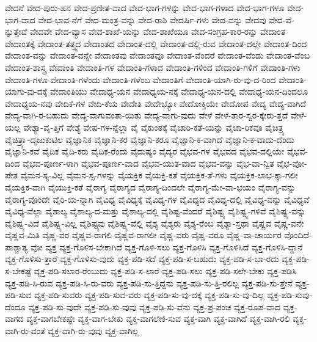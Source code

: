 {ವೇದನೆ
ವೇದ-ಪುರು-ಷನ
ವೇದ-ಪ್ರಣೀತ-ವಾದ
ವೇದ-ಭಾಗ-ಗಳನ್ನು
ವೇದ-ಭಾಗ-ಗಳಾದ
ವೇದ-ಭಾಗ-ಗಳೂ
ವೇದ-ಭಾಗ-ವಾದ
ವೇದ-ಭಾವ-ನೆಗೆ
ವೇದ-ಮಂತ್ರ-ವನ್ನು
ವೇದ-ರಾಶಿ
ವೇದರ್ಷಿ-ಗಳು
ವೇದ-ವನ್ನು
ವೇದವು
ವೇದ-ವೆ-ನ್ನುತ್ತೇವೆ
ವೇದವೇ
ವೇದ-ವ್ಯಾಸ
ವೇದ-ಶಾಖೆ-ಯನ್ನು
ವೇದ-ಶಾಖೆಯೂ
ವೇದ-ಸಂಗ್ರಹ-ಕಾರ-ರನ್ನು
ವೇದಾಂತ
ವೇದಾಂತಕ್ಕೆ
ವೇದಾಂತ-ತತ್ತ್ವದ
ವೇದಾಂತದ
ವೇದಾಂತ-ದಲ್ಲಿ
ವೇದಾಂತ-ದಲ್ಲಿ-ರುವ
ವೇದಾಂತ-ದಲ್ಲೇ
ವೇದಾಂತ-ದಿಂದ
ವೇದಾಂತ-ವನ್ನು
ವೇದಾಂತ-ವನ್ನೇ
ವೇದಾಂತವು
ವೇದಾಂತವೂ
ವೇದಾಂತ-ವೆಂದರೆ
ವೇದಾಂತ-ವೆಂದು
ವೇದಾಂತ-ವೆಂಬ
ವೇದಾಂತ-ಶಾಸ್ತ್ರ
ವೇದಾಂತಿ
ವೇದಾಂತಿ-ಗಳ
ವೇದಾಂತಿ-ಗಳಾದ
ವೇದಾಂತಿ-ಗಳಿಂದ
ವೇದಾಂತಿ-ಗಳಿಗೆ
ವೇದಾಂತಿ-ಗಳು
ವೇದಾಂತಿ-ಗಳೂ
ವೇದಾಂತಿ-ಗಳೆಂದು
ವೇದಾಂತಿ-ಗಳೆಂಬ
ವೇದಾಂತಿಗೆ
ವೇದಾಂತಿ-ಯಾಗಿ-ರು-ವು-ದ-ರಿಂದ
ವೇದಾಂತಿ-ಯಾಗು-ವು-ದಕ್ಕೆ
ವೇದಾಂತಿಯು
ವೇದಾಧ್ಯ-ಯನ
ವೇದಾಧ್ಯಯ-ನಕ್ಕೆ
ವೇದಾಧ್ಯ-ಯನ-ದಲ್ಲಿ
ವೇದಾಧ್ಯ-ಯನ-ದಿಂದಲೂ
ವೇದಾಧ್ಯಯ-ನವು
ವೇದಿಕೆ-ಗಳ
ವೇದಿ-ಕೆಯ
ವೇದೇತಿ
ವೇದೇಭ್ಯೋ
ವೇದೋಕ್ತಿಯೇ
ವೇದೋಪ
ವೇದ್ಯ
ವೇದ್ಯ-ವಾಗಿದೆ
ವೇದ್ಯ-ವಾಗಿ-ರ-ಬಹುದು
ವೇದ್ಯ-ವಾಗುವಂತಾ-ಯಿತು
ವೇದ್ಯ-ವಾಗು-ವುದು
ವೇಳೆ
ವೇಳೆ-ತಾರ-ಸ್ವರ-ಕ್ಕೇರು-ತ್ತದೆ
ವೇಳೆ-ಯಲ್ಲ
ವೇಶ್ಯಾ-ವೃ-ತ್ತಿಗೆ
ವೇಶ್ಯೆ
ವೇಷ-ಗಳ-ನ್ನೆಲ್ಲಾ
ವೈ
ವೈಕುಂಠಕ್ಕೆ
ವೈಚಾರಿ-ಕತೆ-ಯನ್ನು
ವೈಚಾ-ರಿಕವೂ
ವೈಚಿತ್ರ್ಯ
ವೈಚಿತ್ರ್ಯಾ-ದೃಜುಕುಟಿಲ
ವೈಜ್ಞಾನಿಕ
ವೈಜ್ಞಾನಿ-ಕರ
ವೈಜ್ಞಾನಿ-ಕರೂ
ವೈಜ್ಞಾನಿ-ಕ-ವಾಗಿದೆ
ವೈಜ್ಞಾನಿ-ಕ-ವಾದು-ದೆಂದು
ವೈಜ್ಞಾನಿ-ಕವೆ
ವೈದಿಕ
ವೈದಿ-ಕರು
ವೈದಿಕ-ರೆಂದು
ವೈದುಷ್ಯಂ
ವೈದ್ಯರ
ವೈಭವ-ಗಳ
ವೈಭವದ
ವೈಭವ-ದಲ್ಲಿಯೇ
ವೈಭವ-ದಿಂದ
ವೈಭವ-ಪೂರ್ಣ-ಳಾಗಿ
ವೈಭವ-ಪೂರ್ಣ-ವಾದ
ವೈಭವ-ಯುತ-ವಾದ
ವೈಭವ-ವನ್ನು
ವೈಭ-ವಾ-ನ್ವಿತ
ವೈಭ-ವೋ-ಪೇತ
ವೈಮನ-ಸ್ಯ-ವಿಲ್ಲ
ವೈಮನ-ಸ್ಸ-ಗಳನ್ನು
ವೈಯಕ್ತಿಕ
ವೈಯಕ್ತಿ-ಕತೆ
ವೈಯಕ್ತಿಕ-ತೆ-ಗಳು
ವೈಯಕ್ತಿಕ-ಲಾಭ-ಕ್ಕಾ-ಗಲೀ
ವೈಯಕ್ತಿಕ-ವಾಗಿ
ವೈಯುಕ್ತಿ-ಕತೆ
ವೈರಾಗ್ಯ
ವೈರಾಗ್ಯದ
ವೈರಾಗ್ಯ-ದಿಂದಲೇ
ವೈರಾಗ್ಯ-ಮೇ-ವಾ-ಭಯಂ
ವೈರಾಗ್ಯ-ವನ್ನು
ವೈರಾಗ್ಯ-ವೊಂದೇ
ವೈರಿ-ಯ-ನ್ನಾಗಿ
ವೈವಿಧ್ಯ
ವೈವಿಧ್ಯಕ್ಕೆ
ವೈವಿಧ್ಯ-ಗಳ
ವೈವಿಧ್ಯದ
ವೈವಿಧ್ಯ-ದಲ್ಲಿ
ವೈವಿಧ್ಯ-ವನ್ನು
ವೈವಿಧ್ಯವೆ
ವೈವಿಧ್ಯ-ವೆಲ್ಲಾ
ವೈಶಾಲ್ಯ
ವೈಶಾಲ್ಯ-ದ-ಮತ್ತು
ವೈಶಾಲ್ಯ-ದಲ್ಲಿ
ವೈಶಿಷ್ಟ-ವೆಂದರೆ
ವೈಶಿಷ್ಟ್ಯ
ವೈಶಿಷ್ಟ್ಯ-ಗಳಿವೆ
ವೈಶಿಷ್ಟ್ಯ-ವನ್ನು
ವೈಶಿಷ್ಟ್ಯ-ವಿದೆ
ವೈಶಿಷ್ಟ್ಯ-ವಿಲ್ಲ
ವೈಶಿಷ್ಟ್ಯವು
ವೈಶಿಷ್ಟ್ಯ-ವೆಲ್ಲಿ
ವೈಶ್ಯ
ವೈಶ್ಯರು
ವೈಶ್ಯ-ರೆಂಬ
ವೈಶ್ಯಾ-ಸ್ತಥಾ
ವೈಷ್ಣವ
ವೈಷ್ಣ-ವನೇ
ವೈಷ್ಣವ-ಮಿತಿ
ವೈಷ್ಣ-ವರ
ವೈಷ್ಣವ-ರಾಗಲಿ
ವೈಷ್ಣವ-ರಾಗಲೀ
ವೈಷ್ಣ-ವರು
ವೈಷ್ಣ-ವರೂ
ವೈಷ್ಣ-ವಾ-ಚಾರ್ಯರ
ವೊಂದಿದೆ-ಪಾಶ್ಚಾತ್ಯ
ವೋ
ವ್ಯಕ್ತ
ವ್ಯಕ್ತ-ಗೊಳಿಸ-ಬೇಕಾಗಿದೆ
ವ್ಯಕ್ತ-ಗೊಳಿ-ಸಲು
ವ್ಯಕ್ತ-ಗೊಳಿಸಿ
ವ್ಯಕ್ತ-ಗೊಳಿಸಿದೆ
ವ್ಯಕ್ತ-ಗೊಳಿಸಿ-ದ್ದಾನೆ
ವ್ಯಕ್ತ-ಗೊಳಿಸು-ತ್ತಾರೆ
ವ್ಯಕ್ತ-ಗೊಳಿಸು-ವುದು
ವ್ಯಕ್ತ-ಪಡಿ-ಸದೆ
ವ್ಯಕ್ತ-ಪಡಿ-ಸ-ಬಹುದು
ವ್ಯಕ್ತ-ಪಡಿ-ಸ-ಬಾ-ರದು
ವ್ಯಕ್ತ-ಪಡಿ-ಸ-ಬೇಕಷ್ಟೆ
ವ್ಯಕ್ತ-ಪಡಿ-ಸಲಾರ-ರೆಂಬುದು
ವ್ಯಕ್ತ-ಪಡಿ-ಸ-ಲಾರೆ
ವ್ಯಕ್ತ-ಪಡಿ-ಸಲು
ವ್ಯಕ್ತ-ಪಡಿ-ಸಲೇ-ಬೇಕು
ವ್ಯಕ್ತ-ಪಡಿಸಿ
ವ್ಯಕ್ತ-ಪಡಿ-ಸಿ-ರುವ
ವ್ಯಕ್ತ-ಪಡಿ-ಸಿ-ರು-ವರು
ವ್ಯಕ್ತ-ಪಡಿ-ಸು-ತ್ತಿದ್ದನು
ವ್ಯಕ್ತ-ಪಡಿ-ಸು-ತ್ತಿ-ರಲಿಲ್ಲ
ವ್ಯಕ್ತ-ಪಡಿ-ಸು-ತ್ತೇನೆ
ವ್ಯಕ್ತ-ಪಡಿ-ಸುವ
ವ್ಯಕ್ತ-ಪಡಿ-ಸುವರು
ವ್ಯಕ್ತ-ಪಡಿ-ಸುವ-ವರು
ವ್ಯಕ್ತ-ಪಡಿ-ಸು-ವು-ದಕ್ಕೆ
ವ್ಯಕ್ತ-ಪಡಿ-ಸು-ವು-ದಿಲ್ಲ
ವ್ಯಕ್ತ-ಪಡಿ-ಸುವು-ದೆಂದೂ
ವ್ಯಕ್ತ-ಪಡಿ-ಸು-ವುದೇ
ವ್ಯಕ್ತ-ಪಡಿ-ಸು-ವುವು
ವ್ಯಕ್ತ-ಪಡಿ-ಸು-ವೆನು
ವ್ಯಕ್ತ-ಪ್ರ-ಪಂಚ
ವ್ಯಕ್ತ-ರೂಪ-ವಾದ
ವ್ಯಕ್ತ-ವಾಗದ
ವ್ಯಕ್ತ-ವಾಗಬೇಕಷ್ಟೇ
ವ್ಯಕ್ತ-ವಾಗ-ಬೇಕು
ವ್ಯಕ್ತ-ವಾಗಲೆಣಿ-ಸುವ
ವ್ಯಕ್ತ-ವಾಗಿ
ವ್ಯಕ್ತ-ವಾಗಿದೆ
ವ್ಯಕ್ತ-ವಾಗಿ-ರಲಿ
ವ್ಯಕ್ತ-ವಾಗಿ-ರು-ವಂತೆ
ವ್ಯಕ್ತ-ವಾಗಿ-ರು-ವುವು
ವ್ಯಕ್ತ-ವಾಗಿಲ್ಲ
}
